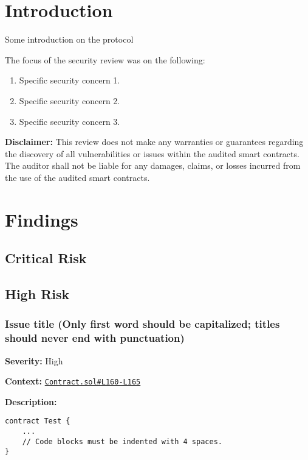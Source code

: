 \section{Introduction}\label{introduction}

Some introduction on the protocol

The focus of the security review was on the following:

\begin{enumerate}
\def\labelenumi{\arabic{enumi}.}
\tightlist
\item
  Specific security concern 1.
\item
  Specific security concern 2.
\item
  Specific security concern 3.
\end{enumerate}

\textbf{Disclaimer:} This review does not make any warranties or
guarantees regarding the discovery of all vulnerabilities or issues
within the audited smart contracts. The auditor shall not be liable for
any damages, claims, or losses incurred from the use of the audited
smart contracts.

\section{Findings}\label{findings}

\subsection{Critical Risk}\label{critical-risk}

\subsection{High Risk}\label{high-risk}

\subsubsection{Issue title (Only first word should be capitalized;
titles should never end with
punctuation)}\label{issue-title-only-first-word-should-be-capitalized-titles-should-never-end-with-punctuation}

\textbf{Severity:} High

\textbf{Context:}
\href{https://github.com/actuallink}{\texttt{Contract.sol\#L160-L165}}

\textbf{Description:}

\begin{verbatim}
contract Test {
    ...
    // Code blocks must be indented with 4 spaces.
}
\end{verbatim}

